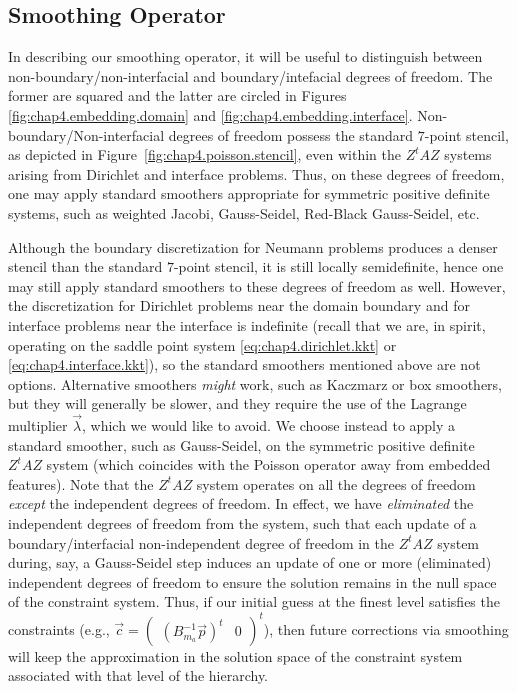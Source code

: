 \subsection{Smoothing Operator} \label{subsec:chap4.multigrid.smoothing}

In describing our smoothing operator, it will be useful to distinguish between non-boundary/\linebreak[0]non-interfacial and boundary/intefacial degrees of freedom. The former are squared and the latter are circled in Figures \ref{fig:chap4.embedding.domain} and \ref{fig:chap4.embedding.interface}. Non-boundary/Non-interfacial degrees of freedom possess the standard $7$-point stencil, as depicted in Figure~\ref{fig:chap4.poisson.stencil}, even within the $Z^tAZ$ systems arising from Dirichlet and interface problems. Thus, on these degrees of freedom, one may apply standard smoothers appropriate for symmetric positive definite systems, such as weighted Jacobi, Gauss-Seidel, Red-Black Gauss-Seidel, etc.

Although the boundary discretization for Neumann problems produces a denser stencil than the standard $7$-point stencil, it is still locally semidefinite, hence one may still apply standard smoothers to these degrees of freedom as well. However, the discretization for Dirichlet problems near the domain boundary and for interface problems near the interface is indefinite (recall that we are, in spirit, operating on the saddle point system \eqref{eq:chap4.dirichlet.kkt} or \eqref{eq:chap4.interface.kkt}), so the standard smoothers mentioned above are not options. Alternative smoothers \emph{might} work, such as Kaczmarz or box smoothers, but they will generally be slower, and they require the use of the Lagrange multiplier $\vec{\lambda}$, which we would like to avoid. We choose instead to apply a standard smoother, such as Gauss-Seidel, on the symmetric positive definite $Z^tAZ$ system (which coincides with the Poisson operator away from embedded features). Note that the $Z^tAZ$ system operates on all the degrees of freedom \emph{except} the independent degrees of freedom. In effect, we have \emph{eliminated} the independent degrees of freedom from the system, such that each update of a boundary/interfacial non-independent degree of freedom in the $Z^tAZ$ system during, say, a Gauss-Seidel step induces an update of one or more (eliminated) independent degrees of freedom to ensure the solution remains in the null space of the constraint system. Thus, if our initial guess at the finest level satisfies the constraints (e.g., $\vec{c} = \begin{pmatrix} (B_{m_a}^{-1} \vec{p})^t & 0 \end{pmatrix}^t$), then future corrections via smoothing will keep the approximation in the solution space of the constraint system associated with that level of the hierarchy.


